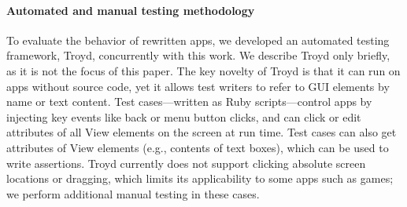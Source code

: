 \documentclass[preprint]{sig-alternate-10pt}
\newcommand{\code}[1]{\textsf{#1}}
\newcommand{\troyd}{Troyd\xspace}
\begin{document}
\paragraph*{Automated and manual testing methodology}



To evaluate the behavior of rewritten apps,
we developed an automated testing framework, \troyd, 
concurrently
with this work. We describe \troyd only briefly, as it is not the
focus of this paper. The key novelty of \troyd is that it can run on
apps without source code, yet it allows test writers to refer to GUI
elements by name
or text content. Test cases---written as Ruby
scripts---control apps by
injecting key events like back or menu button clicks, and can click or
edit attributes of all \code{View} elements on the screen at run
time. Test cases can also get attributes of \code{View} elements (e.g.,
contents of text boxes), which can be used to write assertions.
\troyd currently does not support clicking absolute screen locations
or dragging, which limits its applicability to some apps such as
games; we perform additional manual testing in these cases.

\end{document}
